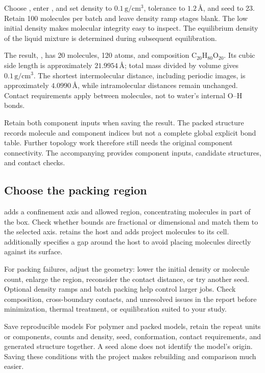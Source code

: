Choose , enter , and set density to $0.1\,\mathrm{g/cm^3}$, tolerance to $1.2\,\text{\AA}$, and seed to 23. Retain 100 molecules per batch and leave density ramp stages blank. The low initial density makes molecular integrity easy to inspect. The equilibrium density of the liquid mixture is determined during subsequent equilibration.

The result, , has 20 molecules, 120 atoms, and composition $\mathrm{C_{20}H_{80}O_{20}}$. Its cubic side length is approximately $21.9954\,\text{\AA}$; total mass divided by volume gives $0.1\,\mathrm{g/cm^3}$. The shortest intermolecular distance, including periodic images, is approximately $4.0990\,\text{\AA}$, while intramolecular distances remain unchanged. Contact requirements apply between molecules, not to water's internal O--H bonds.

Retain both component inputs when saving the result. The packed structure records molecule and component indices but not a complete global explicit bond table. Further topology work therefore still needs the original component connectivity. The accompanying  provides component inputs, candidate structures, and contact checks.

\subsection{Choose the packing region}

 adds a confinement axis and allowed region, concentrating molecules in part of the box. Check whether bounds are fractional or dimensional and match them to the selected axis.  retains the host and adds project molecules to its cell.  additionally specifies a gap around the host to avoid placing molecules directly against its surface.

For packing failures, adjust the geometry: lower the initial density or molecule count, enlarge the region, reconsider the contact distance, or try another seed. Optional density ramps and batch packing help control larger jobs. Check composition, cross-boundary contacts, and unresolved issues in the report before minimization, thermal treatment, or equilibration suited to your study.

\begin{notebox}{Save reproducible models}
For polymer and packed models, retain the repeat units or components, counts and density, seed, conformation, contact requirements, and generated structure together. A seed alone does not identify the model's origin. Saving these conditions with the project makes rebuilding and comparison much easier.
\end{notebox}
